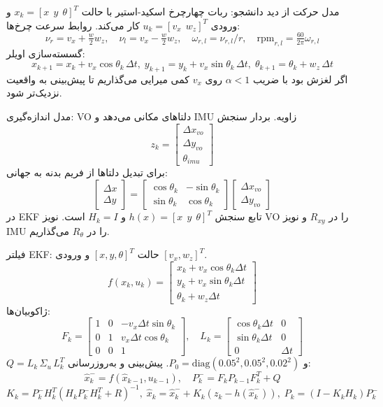 \documentclass[12pt]{exam}
\begin{document}
\vspace{6pt}
\begin{questions}

\question
مدل حرکت از دید دانشجو: ربات چهارچرخ اسکید-استیر با حالت $x_k=[x~~y~~\theta]^T$ و ورودی $u_k=[v_x~~w_z]^T$ کار می‌کند. روابط سرعت چرخ‌ها:
\[
\nu_r=v_x+\tfrac{w}{2}w_z,\quad \nu_l=v_x-\tfrac{w}{2}w_z,\quad
\omega_{r,l}=\nu_{r,l}/r,\quad
\text{rpm}_{r,l}=\tfrac{60}{2\pi}\omega_{r,l}
\]
گسسته‌سازی اویلر:
\[
x_{k+1}=x_k+v_x\cos\theta_k\,\Delta t,\;
y_{k+1}=y_k+v_x\sin\theta_k\,\Delta t,\;
\theta_{k+1}=\theta_k+w_z\,\Delta t
\]
اگر لغزش بود با ضریب $\alpha<1$ روی $v_x$ کمی میرایی می‌گذاریم تا پیش‌بینی به واقعیت نزدیک‌تر شود.

\question
مدل اندازه‌گیری: VO دلتاهای مکانی می‌دهد و IMU زاویه. بردار سنجش
\[
z_k=\begin{bmatrix}\Delta x_{vo}\\ \Delta y_{vo}\\ \theta_{imu}\end{bmatrix}
\]
برای تبدیل دلتاها از فریم بدنه به جهانی:
\[
\begin{bmatrix}\Delta x\\ \Delta y\end{bmatrix}=
\begin{bmatrix}\cos\theta_k & -\sin\theta_k\\ \sin\theta_k & \cos\theta_k\end{bmatrix}
\begin{bmatrix}\Delta x_{vo}\\ \Delta y_{vo}\end{bmatrix}
\]
در EKF تابع سنجش $h(x)=[x~~y~~\theta]^T$ و $H_k=I$ است. نویز VO را در $R_{xy}$ و نویز IMU را در $R_\theta$ می‌گذاریم.

\question
فیلتر EKF: حالت $[x,y,\theta]^T$ و ورودی $[v_x,w_z]^T$.
\[
f(x_k,u_k)=
\begin{bmatrix}
x_k+v_x\cos\theta_k\Delta t\\
y_k+v_x\sin\theta_k\Delta t\\
\theta_k+w_z\Delta t
\end{bmatrix}
\]
ژاکوبیان‌ها:
\[
F_k=
\begin{bmatrix}
1 & 0 & -v_x\Delta t\sin\theta_k\\
0 & 1 &  v_x\Delta t\cos\theta_k\\
0 & 0 & 1
\end{bmatrix},\quad
L_k=
\begin{bmatrix}
\cos\theta_k\Delta t & 0\\
\sin\theta_k\Delta t & 0\\
0 & \Delta t
\end{bmatrix}
\]
$Q=L_k\,\Sigma_u\,L_k^T$ و $P_0=\text{diag}(0.05^2,0.05^2,0.02^2)$. پیش‌بینی و به‌روزرسانی:
\[
\hat x_k^- = f(\hat x_{k-1},u_{k-1}),\quad
P_k^- = F_k P_{k-1} F_k^T + Q
\]
\[
K_k=P_k^-H_k^T(H_kP_k^-H_k^T+R)^{-1},\;
\hat x_k=\hat x_k^-+K_k(z_k-h(\hat x_k^-)),\;
P_k=(I-K_kH_k)P_k^-
\]


\end{questions}
\end{document}
